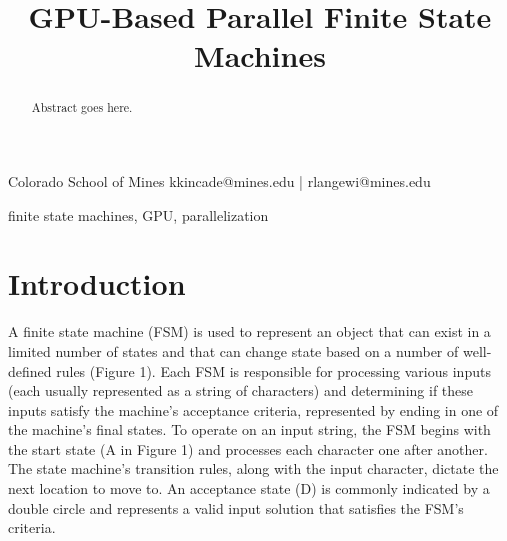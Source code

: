 \documentclass{sigplanconf}
\begin{document}
\setlength{\pdfpageheight}{\paperheight}
\setlength{\pdfpagewidth}{\paperwidth}






\title{GPU-Based Parallel Finite State Machines}

           {Colorado School of Mines}
           {kkincade@mines.edu | rlangewi@mines.edu}

\maketitle

\begin{abstract}
Abstract goes here.
\end{abstract}

\terms
finite state machines, GPU, parallelization

\section{Introduction}

A finite state machine (FSM) is used to represent an object that can exist in a limited number of states and that can change state based on a number of well-defined rules (Figure 1). Each FSM is responsible for processing various inputs (each usually represented as a string of characters) and determining if these inputs satisfy the machine's acceptance criteria, represented by ending in one of the machine's final states. To operate on an input string, the FSM begins with the start state (A in Figure 1) and processes each character one after another. The state machine's transition rules, along with the input character, dictate the next location to move to. An acceptance state (D) is commonly indicated by a double circle and represents a valid input solution that satisfies the FSM's criteria.
\end{document}
